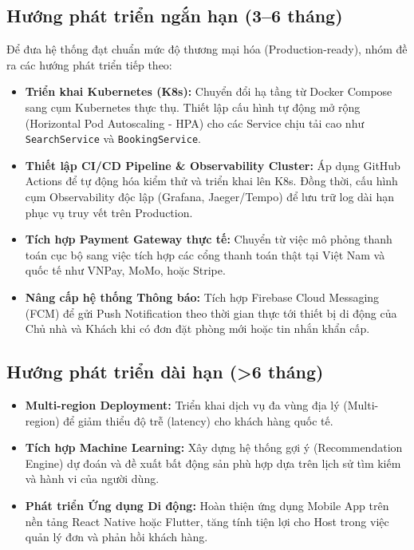 \subsection{Hướng phát triển ngắn hạn (3--6 tháng)}
Để đưa hệ thống đạt chuẩn mức độ thương mại hóa (Production-ready), nhóm đề ra các hướng phát triển tiếp theo:
\begin{itemize}
    \item \textbf{Triển khai Kubernetes (K8s):} Chuyển đổi hạ tầng từ Docker Compose sang cụm Kubernetes thực thụ. Thiết lập cấu hình tự động mở rộng (Horizontal Pod Autoscaling - HPA) cho các Service chịu tải cao như \texttt{SearchService} và \texttt{BookingService}.
    \item \textbf{Thiết lập CI/CD Pipeline \& Observability Cluster:} Áp dụng GitHub Actions để tự động hóa kiểm thử và triển khai lên K8s. Đồng thời, cấu hình cụm Observability độc lập (Grafana, Jaeger/Tempo) để lưu trữ log dài hạn phục vụ truy vết trên Production.
    \item \textbf{Tích hợp Payment Gateway thực tế:} Chuyển từ việc mô phỏng thanh toán cục bộ sang việc tích hợp các cổng thanh toán thật tại Việt Nam và quốc tế như VNPay, MoMo, hoặc Stripe.
    \item \textbf{Nâng cấp hệ thống Thông báo:} Tích hợp Firebase Cloud Messaging (FCM) để gửi Push Notification theo thời gian thực tới thiết bị di động của Chủ nhà và Khách khi có đơn đặt phòng mới hoặc tin nhắn khẩn cấp.
\end{itemize}

\subsection{Hướng phát triển dài hạn (>6 tháng)}
\begin{itemize}
    \item \textbf{Multi-region Deployment:} Triển khai dịch vụ đa vùng địa lý (Multi-region) để giảm thiểu độ trễ (latency) cho khách hàng quốc tế.
    \item \textbf{Tích hợp Machine Learning:} Xây dựng hệ thống gợi ý (Recommendation Engine) dự đoán và đề xuất bất động sản phù hợp dựa trên lịch sử tìm kiếm và hành vi của người dùng.
    \item \textbf{Phát triển Ứng dụng Di động:} Hoàn thiện ứng dụng Mobile App trên nền tảng React Native hoặc Flutter, tăng tính tiện lợi cho Host trong việc quản lý đơn và phản hồi khách hàng.
\end{itemize}
